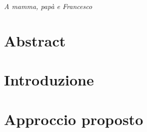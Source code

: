 \documentclass[a4paper, 12pt]{book}
\numberwithin{equation}{section}
\numberwithin{figure}{section}
\numberwithin{table}{section}
\begin{document}
	\thispagestyle{empty} %
	\cleardoublepage

	\clearpage{\pagestyle{plain}\cleardoublepage}
	\vspace*{\fill}
	\begin{flushright}
		\textit{A mamma, papà e Francesco}
	\end{flushright}
	\vspace*{\fill}
	
		
	
	
	\thispagestyle{empty}
	\clearpage{\pagestyle{plain}\cleardoublepage}
	\tableofcontents %
	
	\clearpage{\pagestyle{plain}\cleardoublepage} %
	
	\clearpage{\pagestyle{plain}\cleardoublepage}
	\chapter*{Abstract} %
	\label{chapter:zero}
	
	\clearpage{\pagestyle{plain}\cleardoublepage} %
	\chapter{Introduzione} %
	\label{chapter:primo} %
	
	\clearpage{\pagestyle{plain}\cleardoublepage} %
	\chapter{Approccio proposto} %
	\label{chapter:secondo} %

	\clearpage{\pagestyle{plain}\cleardoublepage} %
\end{document}
